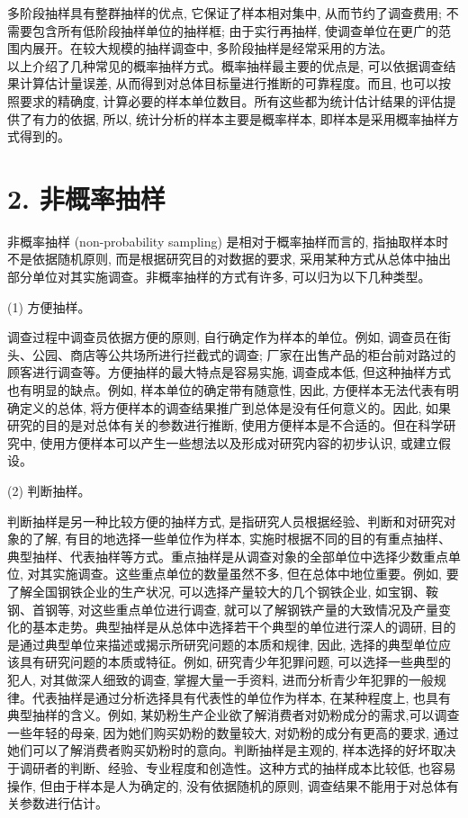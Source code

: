 \documentclass[10pt]{article}
\begin{document}
\begin{CJK*}{UTF8}{bsmi}
多阶段抽样具有整群抽样的优点, 它保证了样本相对集中, 从而节约了调查费用; 不需要包含所有低阶段抽样单位的抽样框; 由于实行再抽样, 使调查单位在更广的范围内展开。在较大规模的抽样调查中, 多阶段抽样是经常采用的方法。\\
以上介绍了几种常见的概率抽样方式。概率抽样最主要的优点是, 可以依据调查结果计算估计量误差, 从而得到对总体目标量进行推断的可靠程度。而且, 也可以按照要求的精确度, 计算必要的样本单位数目。所有这些都为统计估计结果的评估提供了有力的依据, 所以, 统计分析的样本主要是概率样本, 即样本是采用概率抽样方式得到的。

\section*{2. 非概率抽样}
非概率抽样 (non-probability sampling) 是相对于概率抽样而言的, 指抽取样本时不是依据随机原则, 而是根据研究目的对数据的要求, 采用某种方式从总体中抽出部分单位对其实施调查。非概率抽样的方式有许多, 可以归为以下几种类型。

(1) 方便抽样。

调查过程中调查员依据方便的原则, 自行确定作为样本的单位。例如, 调查员在街头、公园、商店等公共场所进行拦截式的调查; 厂家在出售产品的柜台前对路过的顾客进行调查等。方便抽样的最大特点是容易实施, 调查成本低, 但这种抽样方式也有明显的缺点。例如, 样本单位的确定带有随意性, 因此, 方便样本无法代表有明确定义的总体, 将方便样本的调查结果推广到总体是没有任何意义的。因此, 如果研究的目的是对总体有关的参数进行推断, 使用方便样本是不合适的。但在科学研究中, 使用方便样本可以产生一些想法以及形成对研究内容的初步认识, 或建立假设。

(2) 判断抽样。

判断抽样是另一种比较方便的抽样方式, 是指研究人员根据经验、判断和对研究对象的了解, 有目的地选择一些单位作为样本, 实施时根据不同的目的有重点抽样、典型抽样、代表抽样等方式。重点抽样是从调查对象的全部单位中选择少数重点单位, 对其实施调查。这些重点单位的数量虽然不多, 但在总体中地位重要。例如, 要了解全国钢铁企业的生产状况, 可以选择产量较大的几个钢铁企业, 如宝钢、鞍钢、首钢等, 对这些重点单位进行调查, 就可以了解钢铁产量的大致情况及产量变化的基本走势。典型抽样是从总体中选择若干个典型的单位进行深人的调研, 目的是通过典型单位来描述或揭示所研究问题的本质和规律, 因此, 选择的典型单位应该具有研究问题的本质或特征。例如, 研究青少年犯罪问题, 可以选择一些典型的犯人, 对其做深人细致的调查, 掌握大量一手资料, 进而分析青少年犯罪的一般规律。代表抽样是通过分析选择具有代表性的单位作为样本, 在某种程度上, 也具有典型抽样的含义。例如, 某奶粉生产企业欲了解消费者对奶粉成分的需求,可以调查一些年轻的母亲, 因为她们购买奶粉的数量较大, 对奶粉的成分有更高的要求, 通过她们可以了解消费者购买奶粉时的意向。判断抽样是主观的, 样本选择的好坏取决于调研者的判断、经验、专业程度和创造性。这种方式的抽样成本比较低, 也容易操作, 但由于样本是人为确定的, 没有依据随机的原则, 调查结果不能用于对总体有关参数进行估计。


\end{CJK*}
\end{document}
